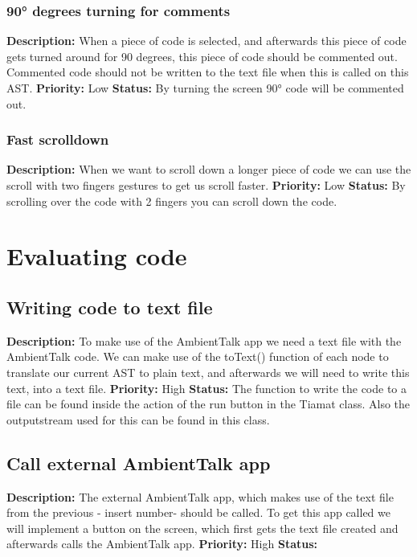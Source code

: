 \documentclass[a4paper,12pt]{report}
\begin{document}
\subsubsection{90° degrees turning for comments}
\textbf{Description: }When a piece of code is selected, and afterwards this piece of code gets turned around for 90 degrees, this piece of code should be commented out. 
Commented code should not be written to the text file when this is called on this AST. \newline
\textbf{Priority:} Low \newline
\textbf{Status: } By turning the screen 90° code will be commented out.\newline
\subsubsection{Fast scrolldown}
\textbf{Description: }When we want to scroll down a longer piece of code we can use the scroll with two fingers gestures to get us scroll faster. \newline
\textbf{Priority:} Low \newline
\textbf{Status: } By scrolling over the code with 2 fingers you can scroll down the code.\newline
\section{Evaluating code}
\subsection{Writing code to text file}
\textbf{Description: }To make use of the AmbientTalk app we need a text file with the AmbientTalk code. We can make use of the toText() function of each node to translate our
current AST to plain text, and afterwards we will need to write this text, into a text file.  \newline
\textbf{Priority:} High \newline
\textbf{Status: } The function to write the code to a file can be found inside the action of the run button in the Tiamat class. Also the outputstream used for this can be found in this class.\newline
\subsection{Call external AmbientTalk app}
\textbf{Description: }The external AmbientTalk app, which makes use of the text file from the previous - insert number- should be called. To get this app called we will implement
a button on the screen, which first gets the text file created and afterwards calls the AmbientTalk app. \newline
\textbf{Priority:} High \newline
\textbf{Status: } \newline
\end{document}
